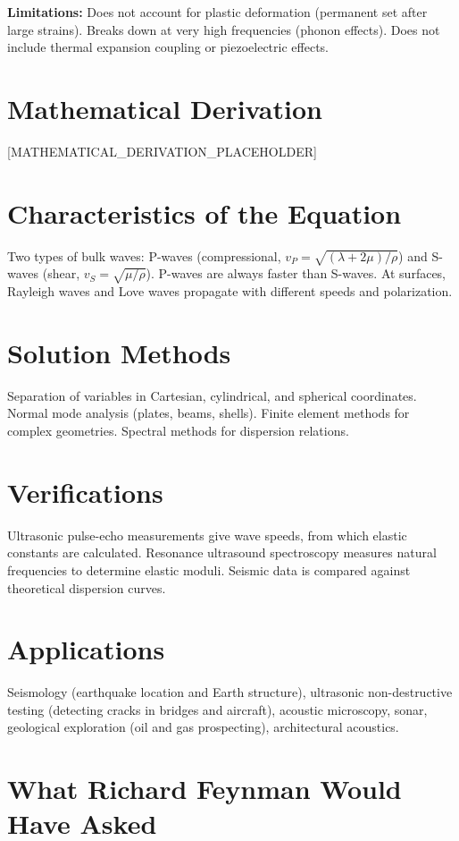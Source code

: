 \documentclass[11pt,openright]{book}
\begin{document}
\textbf{Limitations:} Does not account for plastic deformation (permanent set after large strains). Breaks down at very high frequencies (phonon effects). Does not include thermal expansion coupling or piezoelectric effects.


\section*{Mathematical Derivation}

[MATHEMATICAL_DERIVATION_PLACEHOLDER]

\section*{Characteristics of the Equation}

Two types of bulk waves: P-waves (compressional, $v_P = \sqrt{(\lambda + 2\mu)/\rho}$) and S-waves (shear, $v_S = \sqrt{\mu/\rho}$). P-waves are always faster than S-waves. At surfaces, Rayleigh waves and Love waves propagate with different speeds and polarization.
\section*{Solution Methods}

Separation of variables in Cartesian, cylindrical, and spherical coordinates. Normal mode analysis (plates, beams, shells). Finite element methods for complex geometries. Spectral methods for dispersion relations.
\section*{Verifications}

Ultrasonic pulse-echo measurements give wave speeds, from which elastic constants are calculated. Resonance ultrasound spectroscopy measures natural frequencies to determine elastic moduli. Seismic data is compared against theoretical dispersion curves.
\section*{Applications}

Seismology (earthquake location and Earth structure), ultrasonic non-destructive testing (detecting cracks in bridges and aircraft), acoustic microscopy, sonar, geological exploration (oil and gas prospecting), architectural acoustics.
\section*{What Richard Feynman Would Have Asked}
\end{document}
